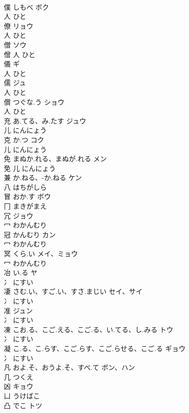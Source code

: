 \documentclass[8pt]{extreport}
\begin{document}
\begin{CJK}{UTF8}{min}
\\	僕	しもべ	ボク	
\\	人		ひと		
\\	僚		リョウ	
\\	人		ひと		
\\	僧		ソウ	
\\	僧	人		ひと		
\\	儀		ギ	
\\	人		ひと		
\\	儒		ジュ	
\\	人		ひと		
\\	償	つぐな.う	ショウ	
\\	人		ひと		
\\	充	あ.てる、み.たす	ジュウ	
\\	儿		にんにょう		
\\	克	か.つ	コク	
\\	儿		にんにょう		
\\	免	まぬか.れる、まぬが.れる	メン	
\\	免	儿		にんにょう		
\\	兼	か.ねる、-か.ねる	ケン	
\\	八		はちがしら		
\\	冒	おか.す	ボウ	
\\	冂		まきがまえ		
\\	冗		ジョウ	
\\	冖		わかんむり		
\\	冠	かんむり	カン	
\\	冖		わかんむり		
\\	冥	くら.い	メイ、ミョウ	
\\	冖		わかんむり		
\\	冶	い.る	ヤ	
\\	冫		にすい		
\\	凄	さむ.い、すご.い、すさ.まじい	セイ、サイ	
\\	冫		にすい		
\\	准		ジュン	
\\	冫		にすい		
\\	凍	こお.る、こご.える、こご.る、い.てる、し.みる	トウ	
\\	冫		にすい		
\\	凝	こ.る、こ.らす、こご.らす、こご.らせる、こご.る	ギョウ	
\\	冫		にすい		
\\	凡	およ.そ、おうよ.そ、すべ.て	ボン、ハン	
\\	几		つくえ		
\\	凶		キョウ	
\\	凵		うけばこ		
\\	凸	でこ	トツ	

\end{CJK}
\end{document}
